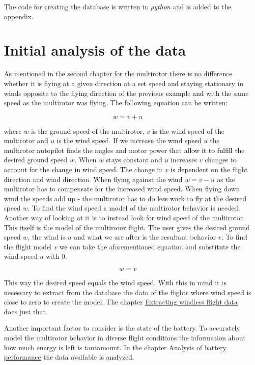 \documentclass[12pt,oneside]{reedthesis}
\theoremstyle{definition}
\theoremstyle{definition}
\theoremstyle{definition}
\theoremstyle{remark}
\begin{document}
The code for creating the database is written in \emph{python} and is
added to the appendix.

\chapter{Initial analysis of the
data}\label{initial-analysis-of-the-data}

As mentioned in the second chapter for the multirotor there is no
difference whether it is flying at a given direction at a set speed and
staying stationary in winds opposite to the flying direction of the
previous example and with the same speed as the multirotor was flying.
The following equation can be written:

\[w = v + u\]

where \(w\) is the ground speed of the multirotor, \(v\) is the wind
speed of the multirotor and \(u\) is the wind speed. If we increase the
wind speed \(u\) the multirotor autopilot finds the angles and motor
power that allow it to fulfill the desired ground speed \(w\). When
\(w\) stays constant and \(u\) increases \(v\) changes to account for
the change in wind speed. The change in \(v\) is dependent on the flight
direction and wind direction. When flying against the wind \(w = v - u\)
as the multirotor has to compensate for the increased wind speed. When
flying down wind the speeds add up - the multirotor has to do less work
to fly at the desired speed \(w\). To find the wind speed a model of the
multirotor behavior is needed. Another way of looking at it is to
instead look for wind speed of the multirotor. This itself is the model
of the multirotor flight. The user gives the desired ground speed \(w\),
the wind is \(u\) and what we are after is the resultant behavior \(v\).
To find the flight model \(v\) we can take the aforementioned equation
and substitute the wind speed \(u\) with 0.

\[w = v\]

This way the desired speed equals the wind speed. With this in mind it
is necessary to extract from the database the data of the flights where
wind speed is close to zero to create the model. The chapter
\protect\hyperlink{extracting-windless-flight-data}{Extracting windless
flight data} does just that.

Another important factor to consider is the state of the battery. To
accurately model the multirotor behavior in diverse flight conditions
the information about how much energy is left is tantamount. In the
chapter \protect\hyperlink{analysis-of-battery-performance}{Analysis of
battery performance} the data available is analyzed.
\end{document}
